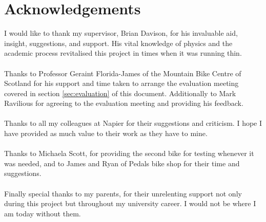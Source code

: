 \section*{Acknowledgements}
	I would like to thank my supervisor, Brian Davison, for his invaluable aid, insight, suggestions, and support. His vital knowledge of physics and the academic process revitalised this project in times when it was running thin.
	\\\\
	Thanks to Professor Geraint Florida-James of the Mountain Bike Centre of Scotland for his support and time taken to arrange the evaluation meeting covered in section \ref{sec:evaluation} of this document. Additionally to Mark Ravilious for agreeing to the evaluation meeting and providing his feedback.
	\\\\
	Thanks to all my colleagues at Napier for their suggestions and criticism. I hope I have provided as much value to their work as they have to mine.
	\\\\
	Thanks to Michaela Scott, for providing the second bike for testing whenever it was needed, and to James and Ryan of Pedals bike shop for their time and suggestions.
	\\\\
	Finally special thanks to my parents, for their unrelenting support not only during this project but throughout my university career. I would not be where I am today without them.